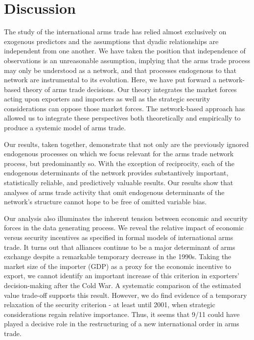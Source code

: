 \documentclass[12pt, letterpaper]{article}
\numberwithin{equation}{section}
\begin{document}
\section{Discussion}

The study of the international arms trade has relied almost exclusively on exogenous predictors and the assumptions that dyadic relationships are independent from one another. 
We have taken the position that independence of observations is an unreasonable assumption, implying that the arms trade process may only be understood as a network, and that processes endogenous to that network are instrumental to its evolution. 
Here, we have put forward a network-based theory of arms trade decisions. 
Our theory integrates the market forces acting upon exporters and importers as well as the strategic security considerations can oppose those market forces. 
The network-based approach has allowed us to integrate these perspectives both theoretically and empirically to produce a systemic model of arms trade. 


Our results, taken together, demonstrate that not only are the previously ignored endogenous processes on which we focus relevant for the arms trade network process, but predominantly so. With the exception of reciprocity, each of the endogenous determinants of the network provides substantively important, statistically reliable, and predictively valuable results. %
Our results show that analyses of arms trade activity that omit endogenous determinants of the network's structure cannot hope to be free of omitted variable bias.


Our analysis also illuminates the inherent tension between economic and security forces in the data generating process. We reveal the relative impact of economic versus security incentives as specified in formal models of international arms trade. It turns out that alliances continue to be a major determinant of arms exchange despite a remarkable temporary decrease in the 1990s. Taking the market size of the importer (GDP) as a proxy for the economic incentive to export, we cannot identify an important increase of this criterion in exporters’ decision-making after the Cold War. A systematic comparison of the estimated value trade-off supports this result. However, we do find evidence of a temporary relaxation of the security criterion - at least until 2001, when strategic considerations regain relative importance. Thus, it seems that 9/11 could have played a decisive role in the restructuring of a new international order in arms trade. 
\end{document}
